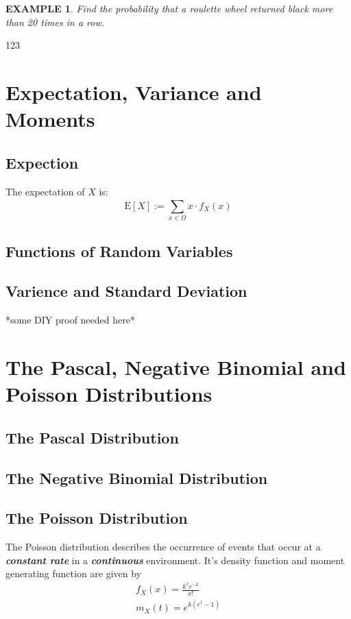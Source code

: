 \documentclass[11pt,a4paper]{article}
\newtheorem*{example}{\bf EXAMPLE}
\begin{document}
\begin{example}
    Find the probability that a roulette wheel returned black more than 20 times in a
    row.
\end{example}



123


\section{Expectation, Variance and Moments}
\subsection{Expection}
The expectation of $X$ is:
\[\mathrm{E}[X]:=\sum_{x\in\Omega}^{}x\cdot f_X(x)\]
\subsection{Functions of Random Variables}


\subsection{Varience and Standard Deviation}
*some DIY proof needed here*


\section{The Pascal, Negative Binomial and Poisson Distributions}
\subsection{The Pascal Distribution}

\subsection{The Negative Binomial Distribution}

\subsection{The Poisson Distribution}
The Poisson distribution describes the occurrence of events that occur
at a {\it\bf constant rate} in a {\it\bf continuous} environment.
It's density function and moment generating function are given by
\begin{align}
    f_X(x) = \frac{k^x e^{-k}}{x!} \\
    m_X  (t) = e^{k(e^t-1)}
\end{align}
\end{document}
